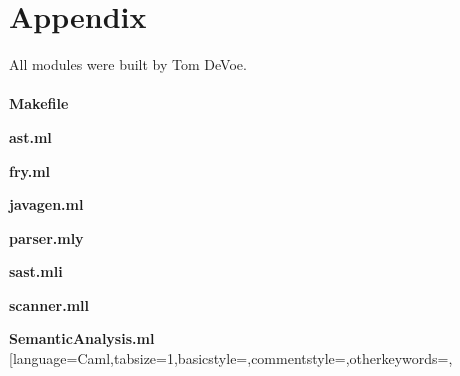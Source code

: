 \documentclass{article}
\begin{document}
\section{Appendix}
All modules were built by Tom DeVoe.
\\\\
{\large \textbf{Makefile}}

{\large \textbf{ast.ml}}

{\large \textbf{fry.ml}}

{\large \textbf{javagen.ml}}

{\large \textbf{parser.mly}}

{\large \textbf{sast.mli}}

{\large \textbf{scanner.mll}}

{\large \textbf{SemanticAnalysis.ml}}
[language=Caml,tabsize=1,basicstyle=\ttm,commentstyle=\color{comment}\ttm,otherkeywords={},
\end{document}
